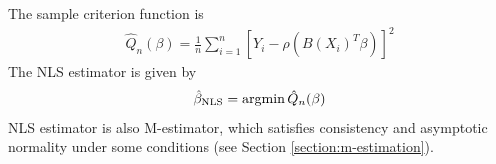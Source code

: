 \documentclass[11pt]{elegantbook}
\newcommand{\argmin}{\operatornamewithlimits{argmin}}
\begin{document}
The sample criterion function is
\begin{equation}
    \begin{aligned}
        \hat{Q}_n(\beta)=\frac{1}{n}\sum_{i=1}^n[Y_i-\rho(B(X_i)^T\beta)]^2
    \end{aligned}
    \nonumber
\end{equation}
The NLS estimator is given by
\begin{equation}
    \begin{aligned}
        \hat{\beta}_\textnormal{NLS}=\argmin \hat{Q}_n(\beta)
    \end{aligned}
    \nonumber
\end{equation}
NLS estimator is also M-estimator, which satisfies consistency and asymptotic normality under some conditions (see Section \ref{section:m-estimation}).
\end{document}
